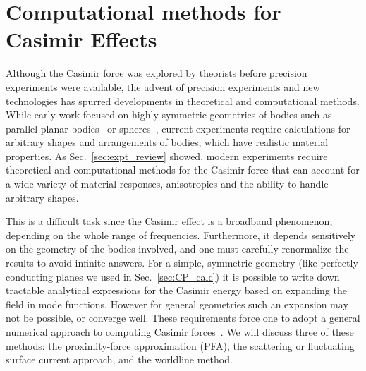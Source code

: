 


\section{Computational methods for Casimir Effects}
\label{sec:numerical_review}

Although the Casimir force was explored by theorists before precision experiments were available,
the advent of precision experiments and new technologies has spurred developments in 
theoretical and computational methods.
While early work focused on highly symmetric geometries 
of bodies such as parallel planar bodies~\cite{Casimir1948,Lifshitz1956} or spheres~\cite{Boyer1968}, 
current experiments require calculations for arbitrary shapes and arrangements of bodies, 
which have realistic material properties.  
As Sec.~\ref{sec:expt_review} showed, modern experiments require theoretical and computational methods
for the Casimir force that can account for a wide variety of material responses, anisotropies
and the ability to handle arbitrary shapes.  

This is a difficult task since the Casimir effect is a broadband phenomenon, depending on the whole 
range of frequencies.  Furthermore, it depends sensitively on the geometry of the bodies involved, 
and one must carefully renormalize the results to avoid infinite answers.  
For a simple, symmetric geometry (like perfectly conducting planes we used in Sec.~\ref{sec:CP_calc})
it is possible to write down tractable analytical expressions for
the Casimir energy based on expanding the field in mode functions.  However for general geometries 
such an expansion may not be possible, or converge well.
These requirements force one to adopt a general numerical approach to computing Casimir forces~\cite{Johnson2011}.
We will discuss three of these methods: the proximity-force approximation (PFA), the scattering
or fluctuating surface current approach, and the worldline method.

